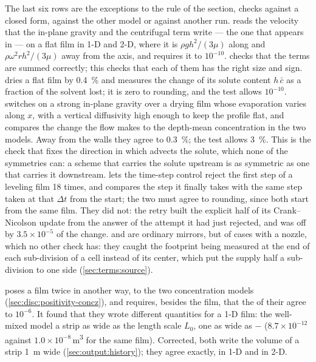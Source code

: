 The last six rows are the exceptions to the rule of the section, checks
against a closed form, against the other model or against another run.  reads
the velocity that the in-plane gravity and the centrifugal term write --- the
one that appears in  --- on a
flat film in 1-D and 2-D, where it is $\rho g h^2/(3\mu)$ along 
and $\rho\omega^2 r h^2/(3\mu)$ away from the axis, and requires it to
$10^{-10}$.  checks that the terms are summed
correctly; this checks that each of them has the right size and sign.
 dries a flat  film by \SI{0.4}{\percent} and
measures the change of its solute content $h\,\bar c$ as a fraction of the
solvent lost; it is zero to rounding, and the test allows $10^{-10}$.  switches on a
strong in-plane gravity over a drying film whose evaporation varies along $x$,
with a vertical diffusivity high enough to keep the  profile flat,
and compares the change the flow makes to the depth-mean concentration in the
two models. Away from the walls they agree to \SI{0.3}{\percent}; the test
allows \SI{3}{\percent}. This is the check that fixes the direction in which
 advects the solute, which none of the symmetries can: a scheme that
carries the solute upstream is as symmetric as one that carries it
downstream.  lets the time-step control reject the first
step of a leveling film 18 times, and compares the step it finally takes
with the same step taken at that $\Delta t$ from the start; the two must agree
to rounding, since both start from the same film. They did not: the retry
built the explicit half of its Crank--Nicolson update from the answer of the
attempt it had just rejected, and was off by $3.5\times10^{-5}$ of the change.
 and  are ordinary
mirrors, but of cases with a nozzle, which no other check has: they caught the footprint being measured
at the end of each sub-division of a cell instead of its center, which put the
supply half a sub-division to one side (\cref{sec:terms:source}).

 poses a film twice in another way, to the two
concentration models (\cref{sec:disc:positivity-concz}), and requires, besides
the film, that the  of their  agree to
$10^{-6}$. It found that they wrote different quantities for a 1-D film: the
well-mixed model a strip as wide as the length scale $L_0$,  one as
wide as  $-$  ($8.7\times10^{-12}$ against
$1.0\times10^{-8}$\,\si{\metre\cubed} for the same film). Corrected, both write
the volume of a strip \SI{1}{\metre} wide (\cref{sec:output:history}); they
agree exactly, in 1-D and in 2-D.

